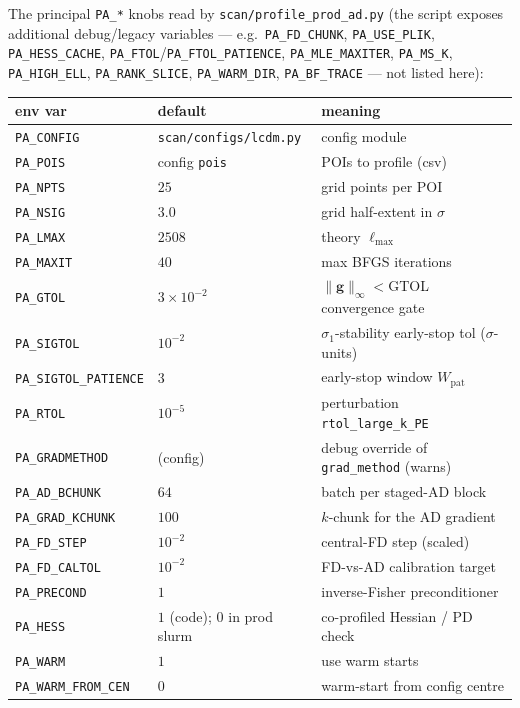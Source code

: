 \documentclass[11pt]{article}
\newcommand{\code}[1]{\texttt{\small #1}}
\newcommand{\file}[1]{\texttt{\small #1}}
\newcommand{\ginf}{\lVert \bm{g}\rVert_\infty}
\newcommand{\Lmax}{\ell_{\max}}
\begin{document}
The principal \code{PA\_*} knobs read by \file{scan/profile\_prod\_ad.py}
(the script exposes additional debug/legacy variables --- e.g.\
\code{PA\_FD\_CHUNK}, \code{PA\_USE\_PLIK}, \code{PA\_HESS\_CACHE}, \code{PA\_FTOL}/\code{PA\_FTOL\_PATIENCE},
\code{PA\_MLE\_MAXITER}, \code{PA\_MS\_K}, \code{PA\_HIGH\_ELL},
\code{PA\_RANK\_SLICE}, \code{PA\_WARM\_DIR}, \code{PA\_BF\_TRACE} --- not
listed here):
\begin{longtable}{p{}p{}p{}}
\toprule
env var & default & meaning \\
\midrule
\endhead
\code{PA\_CONFIG} & \code{scan/configs/lcdm.py} & config module \\
\code{PA\_POIS} & config \code{pois} & POIs to profile (csv) \\
\code{PA\_NPTS} & $25$ & grid points per POI \\
\code{PA\_NSIG} & $3.0$ & grid half-extent in $\sigma$ \\
\code{PA\_LMAX} & $2508$ & theory $\Lmax$ \\
\code{PA\_MAXIT} & $40$ & max BFGS iterations \\
\code{PA\_GTOL} & $3\times10^{-2}$ & $\ginf<$GTOL convergence gate \\
\code{PA\_SIGTOL} & $10^{-2}$ & $\sigma_1$-stability early-stop tol ($\sigma$-units) \\
\code{PA\_SIGTOL\_PATIENCE} & $3$ & early-stop window $W_{\mathrm{pat}}$ \\
\code{PA\_RTOL} & $10^{-5}$ & perturbation \code{rtol\_large\_k\_PE} \\
\code{PA\_GRADMETHOD} & (config) & debug override of \code{grad\_method} (warns) \\
\code{PA\_AD\_BCHUNK} & $64$ & batch per staged-AD block \\
\code{PA\_GRAD\_KCHUNK} & $100$ & $k$-chunk for the AD gradient \\
\code{PA\_FD\_STEP} & $10^{-2}$ & central-FD step (scaled) \\
\code{PA\_FD\_CALTOL} & $10^{-2}$ & FD-vs-AD calibration target \\
\code{PA\_PRECOND} & $1$ & inverse-Fisher preconditioner \\
\code{PA\_HESS} & $1$ (code); $0$ in prod slurm & co-profiled Hessian / PD check \\
\code{PA\_WARM} & $1$ & use warm starts \\
\code{PA\_WARM\_FROM\_CEN} & $0$ & warm-start from config centre \\

\end{longtable}
\end{document}

